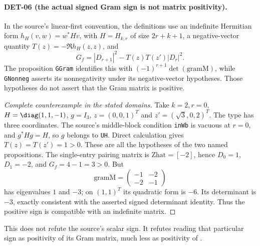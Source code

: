\paragraph{DET-06 (the actual signed Gram sign is not matrix positivity).}
In the source's linear-first convention, the definitions use an indefinite Hermitian form $h_H(v,w)=w^*Hv$, with $H=H_{k,r}$ of size $2r+k+1$, a negative-vector quantity $T(z)=-\Re h_H(z,z)$, and
\[
 G_f=|D_{r+1}|^2-T(z)T(z')|D_r|^2.
\]
The proposition \texttt{GGram} identifies this with $(-1)^{r+1}\det(\mathrm{gramM})$, while \texttt{GNonneg} asserts its nonnegativity under its negative-vector hypotheses. Those hypotheses do not assert that the Gram matrix is positive.
\begin{proof}[Complete counterexample in the stated domains]
Take $k=2,r=0$, $H=\diag(1,1,-1)$, $g=I_3$, $z=(0,0,1)^T$ and $z'=(\sqrt3,0,2)^T$. The type has three coordinates. The source's middle-block condition \texttt{inWb} is vacuous at $r=0$, and $g^*Hg=H$, so $g$ belongs to \texttt{UH}. Direct calculation gives $T(z)=T(z')=1>0$. These are all the hypotheses of the two named propositions. The single-entry pairing matrix is $\mathrm{Zhat}=[-2]$, hence $D_0=1$, $D_1=-2$, and $G_f=4-1=3>0$. But
\[
 \mathrm{gramM}=\begin{pmatrix}-1&-2\\-2&-1\end{pmatrix}
\]
has eigenvalues $1$ and $-3$; on $(1,1)^T$ its quadratic form is $-6$. Its determinant is $-3$, exactly consistent with the asserted signed determinant identity. Thus the positive sign is compatible with an indefinite matrix.
\end{proof}
This does not refute the source's scalar sign. It refutes reading that particular sign as positivity of its Gram matrix, much less as positivity of .

